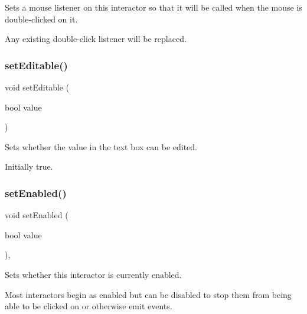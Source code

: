 Sets a mouse listener on this interactor so that it will be called when the mouse is double-\/clicked on it. 

Any existing double-\/click listener will be replaced. \mbox{\label{classsgl_1_1GTextField_a008d7fd44fb3e7a6886cdaddbc3644a2}} 
\subsubsection{\texorpdfstring{set\+Editable()}{setEditable()}}
{\footnotesize\ttfamily void set\+Editable (\begin{DoxyParamCaption}\item[{bool}]{value }\end{DoxyParamCaption})\hspace{0.3cm}{\ttfamily [virtual]}}



Sets whether the value in the text box can be edited. 

Initially true. \mbox{\label{classsgl_1_1GInteractor_ab831367dd84bbd579e02e55bacb21343}} 
\subsubsection{\texorpdfstring{set\+Enabled()}{setEnabled()}}
{\footnotesize\ttfamily void set\+Enabled (\begin{DoxyParamCaption}\item[{bool}]{value }\end{DoxyParamCaption})\hspace{0.3cm}{\ttfamily [virtual]}, {\ttfamily [inherited]}}



Sets whether this interactor is currently enabled. 

Most interactors begin as enabled but can be disabled to stop them from being able to be clicked on or otherwise emit events. \mbox{\label{classsgl_1_1GObservable_ad2f6d34961c50f6c1e0659990b79f741}} 
